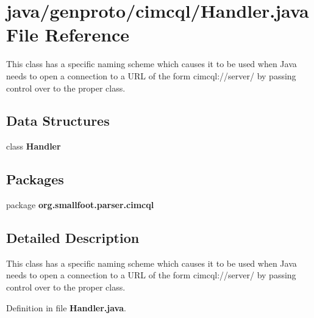 \section{java/genproto/cimcql/\+Handler.java File Reference}
\label{genproto_2cimcql_2Handler_8java}


This class has a specific naming scheme which causes it to be used when Java needs to open a connection to a U\+R\+L of the form cimcql\+://server/ by passing control over to the proper class.  


\subsection*{Data Structures}
\begin{DoxyCompactItemize}
\item 
class {\bf Handler}
\end{DoxyCompactItemize}
\subsection*{Packages}
\begin{DoxyCompactItemize}
\item 
package {\bf org.\+smallfoot.\+parser.\+cimcql}
\end{DoxyCompactItemize}


\subsection{Detailed Description}
This class has a specific naming scheme which causes it to be used when Java needs to open a connection to a U\+R\+L of the form cimcql\+://server/ by passing control over to the proper class. 



Definition in file {\bf Handler.\+java}.

